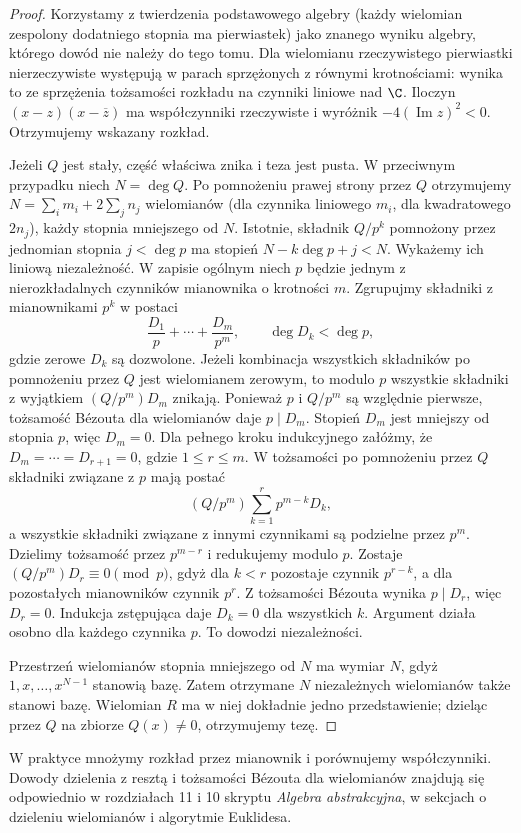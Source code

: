 \begin{proof}
Korzystamy z twierdzenia podstawowego algebry (każdy wielomian zespolony dodatniego stopnia ma pierwiastek) jako znanego wyniku algebry, którego dowód nie należy do tego tomu. Dla wielomianu rzeczywistego pierwiastki nierzeczywiste występują w parach sprzężonych z równymi krotnościami: wynika to ze sprzężenia tożsamości rozkładu na czynniki liniowe nad $\C$. Iloczyn $(x-z)(x-\overline z)$ ma współczynniki rzeczywiste i wyróżnik $-4(\operatorname{Im}z)^2<0$. Otrzymujemy wskazany rozkład.

Jeżeli $Q$ jest stały, część właściwa znika i teza jest pusta. W przeciwnym przypadku niech $N=\deg Q$. Po pomnożeniu prawej strony przez $Q$ otrzymujemy $N=\sum_i m_i+2\sum_j n_j$ wielomianów (dla czynnika liniowego $m_i$, dla kwadratowego $2n_j$), każdy stopnia mniejszego od $N$. Istotnie, składnik $Q/p^k$ pomnożony przez jednomian stopnia $j<\deg p$ ma stopień $N-k\deg p+j<N$. Wykażemy ich liniową niezależność. W zapisie ogólnym niech $p$ będzie jednym z nierozkładalnych czynników mianownika o krotności $m$. Zgrupujmy składniki z mianownikami $p^k$ w postaci
\[
 \frac{D_1}{p}+\cdots+\frac{D_m}{p^m},
 \qquad \deg D_k<\deg p,
\]
gdzie zerowe $D_k$ są dozwolone. Jeżeli kombinacja wszystkich składników po pomnożeniu przez $Q$ jest wielomianem zerowym, to modulo $p$ wszystkie składniki z wyjątkiem $(Q/p^m)D_m$ znikają. Ponieważ $p$ i $Q/p^m$ są względnie pierwsze, tożsamość Bézouta dla wielomianów daje $p\mid D_m$. Stopień $D_m$ jest mniejszy od stopnia $p$, więc $D_m=0$. Dla pełnego kroku indukcyjnego załóżmy, że $D_m=\cdots=D_{r+1}=0$, gdzie $1\le r\le m$. W tożsamości po pomnożeniu przez $Q$ składniki związane z $p$ mają postać
\[
 (Q/p^m)\sum_{k=1}^{r}p^{m-k}D_k,
\]
a wszystkie składniki związane z innymi czynnikami są podzielne przez $p^m$. Dzielimy tożsamość przez $p^{m-r}$ i redukujemy modulo $p$. Zostaje $(Q/p^m)D_r\equiv0\pmod p$, gdyż dla $k<r$ pozostaje czynnik $p^{r-k}$, a dla pozostałych mianowników czynnik $p^r$. Z tożsamości Bézouta wynika $p\mid D_r$, więc $D_r=0$. Indukcja zstępująca daje $D_k=0$ dla wszystkich $k$. Argument działa osobno dla każdego czynnika $p$. To dowodzi niezależności.

Przestrzeń wielomianów stopnia mniejszego od $N$ ma wymiar $N$, gdyż $1,x,\ldots,x^{N-1}$ stanowią bazę. Zatem otrzymane $N$ niezależnych wielomianów także stanowi bazę. Wielomian $R$ ma w niej dokładnie jedno przedstawienie; dzieląc przez $Q$ na zbiorze $Q(x)\ne0$, otrzymujemy tezę.
\end{proof}
W praktyce mnożymy rozkład przez mianownik i porównujemy współczynniki. Dowody dzielenia z resztą i tożsamości Bézouta dla wielomianów znajdują się odpowiednio w rozdziałach 11 i 10 skryptu \emph{Algebra abstrakcyjna}, w sekcjach o dzieleniu wielomianów i algorytmie Euklidesa.

